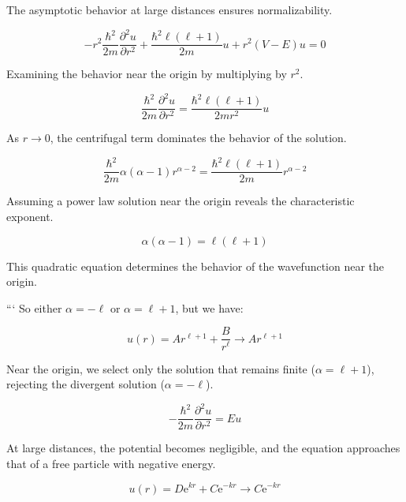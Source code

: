 \documentclass[italian]{HKNdocument}
\begin{document}
The asymptotic behavior at large distances ensures normalizability.

\begin{equation*}
-r^{2} \frac{\hbar^{2}}{2 m} \frac{\partial^{2} u}{\partial r^{2}}+\frac{\hbar^{2} \ell(\ell+1)}{2 m} u+r^{2}(V-E) u=0 \tag{9.40}
\end{equation*}

Examining the behavior near the origin by multiplying by $r^2$.

\begin{equation*}
\frac{\hbar^{2}}{2 m} \frac{\partial^{2} u}{\partial r^{2}}=\frac{\hbar^{2} \ell(\ell+1)}{2 m r^{2}} u \tag{9.41}
\end{equation*}

As $r \to 0$, the centrifugal term dominates the behavior of the solution.

\begin{equation*}
\frac{\hbar^{2}}{2 m} \alpha(\alpha-1) r^{\alpha-2}=\frac{\hbar^{2} \ell(\ell+1)}{2 m} r^{\alpha-2} \tag{9.42}
\end{equation*}

Assuming a power law solution near the origin reveals the characteristic exponent.

\begin{equation*}
\alpha(\alpha-1)=\ell(\ell+1) \tag{9.43}
\end{equation*}

This quadratic equation determines the behavior of the wavefunction near the origin.

```
So either $\alpha=-\ell$ or $\alpha=\ell+1$, but we have:

\begin{equation*}
u(r)=A r^{\ell+1}+\frac{B}{r^{\ell}} \rightarrow A r^{\ell+1} \tag{9.44}
\end{equation*}

Near the origin, we select only the solution that remains finite ($\alpha=\ell+1$), rejecting the divergent solution ($\alpha=-\ell$).

\begin{equation*}
-\frac{\hbar^{2}}{2 m} \frac{\partial^{2} u}{\partial r^{2}}=E u \tag{9.45}
\end{equation*}

At large distances, the potential becomes negligible, and the equation approaches that of a free particle with negative energy.

\begin{equation*}
u(r)=D \mathrm{e}^{k r}+C \mathrm{e}^{-k r} \rightarrow C \mathrm{e}^{-k r} \tag{9.46}
\end{equation*}
\end{document}
